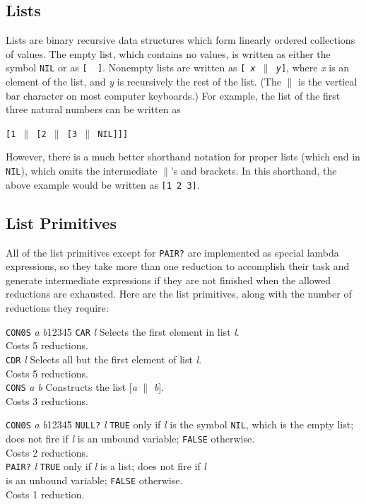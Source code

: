 \subsection{Lists}

	Lists are binary recursive data structures which form linearly
ordered collections of values.  The empty list, which contains no values, is
written as either the symbol {\tt NIL} or as {\tt [ \ ]}.  Nonempty
lists are written as {\tt [ {\sl x} $\parallel$ {\sl y}]}, where {\sl x}
is an element of the list, and {\sl y} is recursively the rest of the
list.  (The $\parallel$ is the vertical bar character on most
computer keyboards.)
For example, the list of the first three natural numbers can be
written as
\begin{center}
	{\tt [1 $\parallel$ [2 $\parallel$ [3 $\parallel$ NIL]]]}
\end{center}
However, there is a much better shorthand notation for proper lists (which end
in {\tt NIL}), which omits the intermediate $\parallel$'s and
brackets.  In this shorthand, the above example would be written as
{\mbox{\tt [1 2 3]}}.


\subsection{List Primitives}

	All of the list primitives except for {\tt PAIR?} are implemented as
special lambda expressions, so they take more than one reduction to
accomplish their task and generate intermediate expressions if they are
not finished when the allowed reductions are exhausted.  Here are the
list primitives, along with the number of reductions they require:
\begin{tabbing}
{\tt CON0S} {\sl a} {\sl b}12345\=\kill
{\tt CAR} {\sl l} \> Selects the first element in list {\sl l}.\\ 
\>Costs 5 reductions.\\
{\tt CDR} {\sl l} \> Selects all but the first element of list {\sl
l}.\\
\> Costs 5 reductions.\\
{\tt CONS} {\sl a} {\sl b} \> Constructs the list   
[{\sl a} $\parallel$ {\sl b}]. \\ \> Costs 3 reductions.\\
\end{tabbing}
\pagebreak
\begin{tabbing}
{\tt CON0S} {\sl a} {\sl b}12345\=\kill
{\tt NULL?} {\sl l} \> {\tt TRUE} only if {\sl l} is the symbol {\tt NIL},
which is the empty list;\\ \> does not fire if {\sl l} is an unbound
variable; {\tt FALSE} otherwise.\\
\>Costs 2 reductions.\\
{\tt PAIR?} {\sl l} \> {\tt TRUE} only if {\sl l} is a list; does not
fire if {\sl l} \\ \> is an unbound variable; {\tt FALSE} otherwise.\\
\>Costs 1 reduction.
\end{tabbing}

